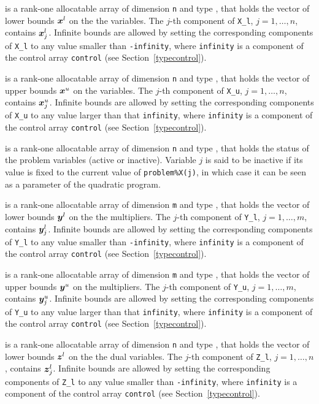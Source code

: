 \documentclass{galahad}
\begin{document}
\begin{description}
 is a rank-one allocatable array of dimension {\tt n} and type
\realdp, that holds
the vector of lower bounds ${\bm{x}}^{l}$ on the the variables.
The $j$-th component of {\tt X\_l}, $j = 1, \ldots , n$,
contains ${\bm{x}}_{j}^{l}$.
Infinite bounds are allowed by setting the corresponding
components of {\tt X\_l} to any value smaller than {\tt -infinity},
where {\tt infinity} is a component of the control array {\tt control}
(see Section~\ref{typecontrol}).

 is a rank-one allocatable array of dimension {\tt n} and type
\realdp, that holds
the vector of upper bounds ${\bm{x}}^{u}$ on the variables.
The $j$-th component of {\tt X\_u}, $j = 1, \ldots , n$,
contains ${\bm{x}}_{j}^{u}$.
Infinite bounds are allowed by setting the corresponding
components of {\tt X\_u} to any value larger than that {\tt infinity},
where {\tt infinity} is a component of the control array {\tt control}
(see Section~\ref{typecontrol}).

 is a rank-one allocatable array of dimension {\tt n} and type
\integer, that holds the status of the problem variables (active or
inactive). Variable $j$ is said to be inactive if its value is fixed to the
current value of {\tt problem\%X(j)}, in which case it can be seen as a
parameter of the quadratic program.

 is a rank-one allocatable array of dimension {\tt m} and type
\realdp, that holds
the vector of lower bounds ${\bm{y}}^{l}$ on the the multipliers.
The $j$-th component of {\tt Y\_l}, $j = 1, \ldots , m$,
contains ${\bm{y}}_{j}^{l}$.
Infinite bounds are allowed by setting the corresponding
components of {\tt Y\_l} to any value smaller than {\tt -infinity},
where {\tt infinity} is a component of the control array {\tt control}
(see Section~\ref{typecontrol}).

 is a rank-one allocatable array of dimension {\tt m} and type
\realdp, that holds
the vector of upper bounds ${\bm{y}}^{u}$ on the multipliers.
The $j$-th component of {\tt Y\_u}, $j = 1, \ldots , m$,
contains ${\bm{y}}_{j}^{u}$.
Infinite bounds are allowed by setting the corresponding
components of {\tt Y\_u} to any value larger than that {\tt infinity},
where {\tt infinity} is a component of the control array {\tt control}
(see Section~\ref{typecontrol}).

 is a rank-one allocatable array of dimension {\tt n} and type
\realdp, that holds
the vector of lower bounds ${\bm{z}}^{l}$ on the the dual variables.
The $j$-th component of {\tt Z\_l}, $j = 1, \ldots , n$,
contains ${\bm{z}}_{j}^{l}$.
Infinite bounds are allowed by setting the corresponding
components of {\tt Z\_l} to any value smaller than {\tt -infinity},
where {\tt infinity} is a component of the control array {\tt control}
(see Section~\ref{typecontrol}).


\end{description}
\end{document}
